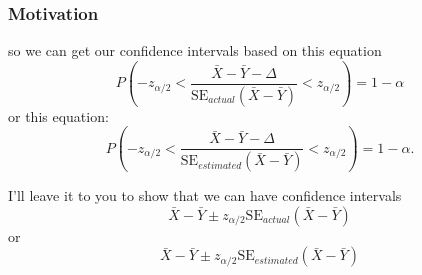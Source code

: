 \documentclass{beamer}
\begin{document}
\begin{frame}
\frametitle{Motivation}

so we can get our confidence intervals based on this equation
\[
P \left( - z_{\alpha/2} < \frac{\bar{X} - \bar{Y} - \Delta}{\text{SE}_{actual}(\bar{X} - \bar{Y})} < z_{\alpha/2} \right) = 1-\alpha
\]
or this equation:
\[
P \left( - z_{\alpha/2} < \frac{\bar{X} - \bar{Y} - \Delta}{\text{SE}_{estimated}(\bar{X} - \bar{Y})} < z_{\alpha/2} \right) = 1-\alpha.
\]

I'll leave it to you to show that we can have confidence intervals
\[
\bar{X} - \bar{Y} \pm z_{\alpha/2} \text{SE}_{actual}(\bar{X} - \bar{Y})
\]
or
\[
\bar{X} - \bar{Y} \pm z_{\alpha/2} \text{SE}_{estimated}(\bar{X} - \bar{Y})
\]
\end{frame}
\end{document}
